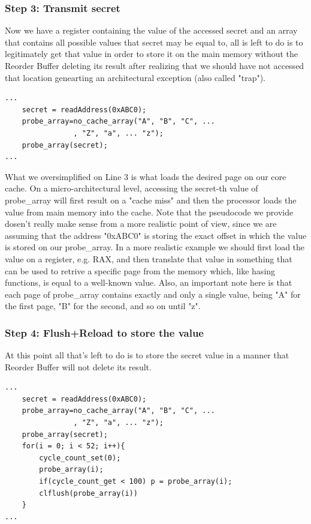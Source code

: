 \subsubsection{Step 3: Transmit secret}
Now we have a register containing the value of the accessed secret and an array that contains all possible values that secret may be equal to,
all is left to do is to legitimately get that value in order to store it on the main memory without the Reorder Buffer deleting its result
after realizing that we should have not accessed that location genearting an architectural exception (also called "trap").

\begin{verbatim}
...
    secret = readAddress(0xABC0);
    probe_array=no_cache_array("A", "B", "C", ... 
                , "Z", "a", ... "z");
    probe_array(secret);
...
\end{verbatim}

What we oversimplified on Line 3 is what loads the desired page on our core cache. On a micro-architectural level, accessing the secret-th value of probe\_array
will first result on a "cache miss" and then the processor loads the value from main memory into the cache.
Note that the pseudocode we provide dosen't really make sense from a more realistic point of view, since we are assuming that the address "0xABC0" is storing the exact
offset in which the value is stored on our probe\_array. In a more realistic example we should first load the value on a register, e.g. RAX,
and then translate that value in something that can be used to retrive a specific page from the memory which,
like hasing functions, is equal to a well-known value. Also, an important note here is that each page
of probe\_array contains exactly and only a single value, being "A" for the first page, "B" for the second, and so on until "z".

\subsubsection{Step 4: Flush+Reload to store the value}
At this point all that's left to do is to store the secret value in a manner that Reorder Buffer will not delete its result.
\begin{verbatim}
...
    secret = readAddress(0xABC0);
    probe_array=no_cache_array("A", "B", "C", ... 
                , "Z", "a", ... "z");
    probe_array(secret);
    for(i = 0; i < 52; i++){
        cycle_count_set(0);
        probe_array(i);
        if(cycle_count_get < 100) p = probe_array(i);
        clflush(probe_array(i))
    }
...
\end{verbatim}

